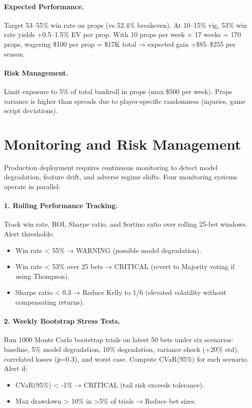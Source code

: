 \paragraph{Expected Performance.}
Target 53--55\% win rate on props (vs 52.4\% breakeven). At 10--15\% vig, 53\% win rate yields +0.5--1.5\% EV per prop. With 10 props per week × 17 weeks = 170 props, wagering \$100 per prop = \$17K total → expected gain +\$85--\$255 per season.

\paragraph{Risk Management.}
Limit exposure to 5\% of total bankroll in props (max \$500 per week). Props variance is higher than spreads due to player‑specific randomness (injuries, game script deviations).

\section{Monitoring and Risk Management}
\label{sec:monitoring}

Production deployment requires continuous monitoring to detect model degradation, feature drift, and adverse regime shifts. Four monitoring systems operate in parallel:

\paragraph{1. Rolling Performance Tracking.}
Track win rate, ROI, Sharpe ratio, and Sortino ratio over rolling 25‑bet windows. Alert thresholds:
\begin{itemize}
\item Win rate < 55\% → WARNING (possible model degradation).
\item Win rate < 53\% over 25 bets → CRITICAL (revert to Majority voting if using Thompson).
\item Sharpe ratio < 0.3 → Reduce Kelly to 1/6 (elevated volatility without compensating returns).
\end{itemize}

\paragraph{2. Weekly Bootstrap Stress Tests.}
Run 1000 Monte Carlo bootstrap trials on latest 50 bets under six scenarios: baseline, 5\% model degradation, 10\% degradation, variance shock (+20\% std), correlated losses (ρ=0.3), and worst case. Compute CVaR(95\%) for each scenario. Alert if:
\begin{itemize}
\item CVaR(95\%) < -1\% → CRITICAL (tail risk exceeds tolerance).
\item Max drawdown > 10\% in >5\% of trials → Reduce bet sizes.
\end{itemize}

